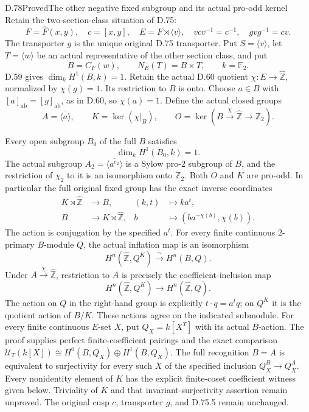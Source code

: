 \begin{claim}{D.78}{Proved}{The other negative fixed subgroup and its actual pro-odd kernel}
Retain the two-section-class situation of D.75:
\[
 F=\widehat F(x,y),\quad c=[x,y],\quad
 E=F\rtimes\langle v\rangle,\quad vcv^{-1}=c^{-1},\quad
 gvg^{-1}=cv.
\]
The transporter $g$ is the unique original D.75 transporter. Put
$S=\langle v\rangle$, let $T=\langle w\rangle$ be an actual representative
of the other section class, and put
\[
 B=C_F(w),\qquad N_E(T)=B\times T,\qquad k=\mathbb F_2.
\]
D.59 gives $\dim_kH^1(B,k)=1$. Retain the actual D.60 quotient
$\chi:E\to\widehat{\mathbb Z}$, normalized by $\chi(g)=1$.
Its restriction to $B$ is onto. Choose $a\in B$ with
$[a]_{\mathrm{ab}}=[g]_{\mathrm{ab}}$, as in D.60, so $\chi(a)=1$.
Define the actual closed groups
\[
 A=\overline{\langle a\rangle},\qquad
 K=\ker(\chi|_B),\qquad
 O=\ker(B\xrightarrow{\chi}\widehat{\mathbb Z}\to\mathbb Z_2).
\]

Every open subgroup $B_0$ of the full $B$ satisfies
\[
                         \dim_k H^1(B_0,k)=1.                 \tag{D.78.1}
\]
The actual subgroup $A_2=\overline{\langle a^{e_2}\rangle}$ is a
Sylow pro-$2$ subgroup of $B$, and the restriction of $\chi_2$ to it
is an isomorphism onto $\mathbb Z_2$. Both $O$ and $K$ are pro-odd.
In particular the full original fixed group has the exact inverse coordinates
\[
 \begin{aligned}
 K\rtimes\widehat{\mathbb Z}&\longrightarrow B,
       &(k,t)&\longmapsto k a^t,\\
 B&\longrightarrow K\rtimes\widehat{\mathbb Z},
       &b&\longmapsto(ba^{-\chi(b)},\chi(b)).
 \end{aligned}                                                \tag{D.78.2}
\]
The action is conjugation by the specified $a^t$.
For every finite continuous $2$-primary $B$-module $Q$, the actual inflation map is
an isomorphism
\[
       H^n(\widehat{\mathbb Z},Q^K)
                       \xrightarrow{\ \sim\ }H^n(B,Q).       \tag{D.78.3}
\]
Under $A\xrightarrow{\chi}\widehat{\mathbb Z}$, restriction to $A$
is precisely the coefficient-inclusion map
\[
 H^n(\widehat{\mathbb Z},Q^K)
                \longrightarrow H^n(\widehat{\mathbb Z},Q).   \tag{D.78.4}
\]
The action on $Q$ in the right-hand group is explicitly
$t\cdot q=a^t q$; on $Q^K$ it is the quotient action of $B/K$.
These actions agree on the indicated submodule.
For every finite continuous $E$-set $X$, put $Q_X=k[X^T]$ with its
actual $B$-action. The proof supplies perfect finite-coefficient pairings
and the exact comparison $\mathcal U_T(k[X])\cong
H^0(B,Q_X)\oplus H^1(B,Q_X)$. The full recognition $B=A$ is equivalent
to surjectivity for every such $X$ of the specified inclusion
$Q_X^B\to Q_X^A$. Every nonidentity element of $K$ has the explicit
finite-coset coefficient witness given below.
Triviality of $K$ and that invariant-surjectivity assertion remain
unproved. The original cusp $c$, transporter $g$, and D.75.5 remain
unchanged.

\end{claim}

